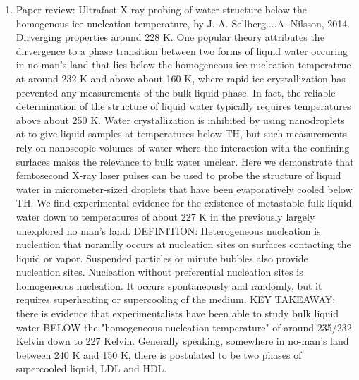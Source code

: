 \documentclass[12pt,reqno]{amsart}
\numberwithin{equation}{section}
\begin{document}
\begin{enumerate}
\item Paper review: Ultrafast X-ray probing of water structure below the homogenous ice nucleation temperature, by J. A. Sellberg....A. Nilsson, 2014.  
\subitem Dirverging properties around 228 K.  One popular theory attributes the dirvergence to a phase transition between two forms of liquid water occuring in no-man's land that lies below the homogeneous ice nucleation temperatrue at around 232 K and above about 160 K, where rapid ice crystallization has prevented any measurements of the bulk liquid phase.  In fact, the reliable determination of the structure of liquid water typically requires temperatures above about 250 K.  Water crystallization is inhibited by using nanodroplets at to give liquid samples at temperatures below TH, but such measurements rely on nanoscopic volumes of water where the interaction with the confining surfaces makes the relevance to bulk water unclear.  Here we demonstrate that femtosecond X-ray laser pulses can be used to probe the structure of liquid water in micrometer-sized droplets that have been evaporatively cooled below TH.  We find experimental evidence for the existence of metastable fulk liquid water down to temperatures of about 227 K in the previously largely unexplored no man's land.  DEFINITION: Heterogeneous nucleation is nucleation that noramlly occurs at nucleation sites on surfaces contacting the liquid or vapor.  Suspended particles or minute bubbles also provide nucleation sites.  Nucleation without preferential nucleation sites is homogeneous nucleation.  It occurs spontaneously and randomly, but it requires superheating or supercooling of the medium.  KEY TAKEAWAY: there is evidence that experimentalists have been able to study bulk liquid water BELOW the "homogeneous nucleation temperature" of around 235/232 Kelvin down to 227 Kelvin.  Generally speaking, somewhere in no-man's land between 240 K and 150 K, there is postulated to be two phases of supercooled liquid, LDL and HDL.  


\end{enumerate}
\end{document}
